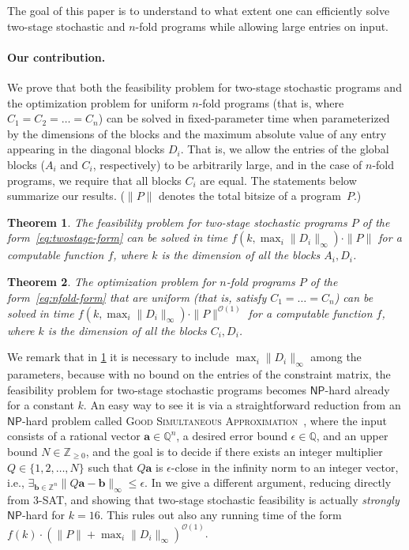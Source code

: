 \documentclass{article}
\newtheorem{theorem}{Theorem}\newtheorem{lemma}[theorem]{Lemma}\newtheorem{proposition}[theorem]{Proposition}\newtheorem{corollary}[theorem]{Corollary}\newtheorem{definition}[theorem]{Definition}\newtheorem{claim}[theorem]{Claim}\newtheorem{remark}[theorem]{Remark}\newtheorem{observation}[theorem]{Observation}\newtheorem{conjecture}[theorem]{Conjecture}\newtheorem{example}[theorem]{Example}
\renewcommand{\leq}{\leqslant}
\renewcommand{\geq}{\geqslant}
\newcommand{\Z}{\mathbb{Z}}
\newcommand{\Zn}{\Z_{\geq 0}}
\newcommand{\Q}{\mathbb{Q}}
\newcommand{\tup}[1]{{\mathbf{#1}}}
\newcommand{\av}{\tup a}
\newcommand{\bb}{\tup b}
\newcommand{\Oh}{{\mathcal{O}}}
\begin{document}
The goal of this paper is to understand to what extent one can efficiently solve two-stage stochastic and $n$-fold programs
while allowing large entries on input.

\paragraph*{Our contribution.} We prove that both the feasibility problem for two-stage stochastic programs and the optimization problem for uniform $n$-fold programs (that is, where $C_1=C_2=\ldots=C_n$) can be solved in fixed-parameter time when parameterized by the dimensions of the blocks and the maximum absolute value of any entry appearing in the diagonal blocks $D_i$. That is, we allow the entries of the global blocks ($A_i$ and $C_i$, respectively) to be arbitrarily large, and in the case of $n$-fold programs, we require that all blocks $C_i$ are equal. The statements below summarize our results. ($\|P\|$ denotes the total bitsize of a program~$P$.)

\begin{theorem}\label{thm:2stage-intro}
   The feasibility problem for two-stage stochastic programs $P$ of the form~\cref{eq:twostage-form} can be solved in time $f(k,\max_i \|D_i\|_\infty)\cdot \|P\|$ for a computable function $f$, where $k$ is the dimension of all the blocks $A_i,D_i$.
\end{theorem}

\begin{theorem}\label{thm:nfold-intro}
    The optimization problem for $n$-fold programs $P$ of the form~\cref{eq:nfold-form} that are uniform (that is, satisfy $C_1=\ldots=C_n$) can be solved in time $f(k,\max_i \|D_i\|_\infty)\cdot \|P\|^{\Oh(1)}$ for a computable function $f$, where $k$ is the dimension of all the blocks $C_i,D_i$.
\end{theorem}

We remark that in \cref{thm:2stage-intro} it is necessary to include $\max_i \|D_i\|_\infty$ among the parameters, because with no bound on the entries of the constraint matrix, the feasibility problem for two-stage stochastic programs becomes $\mathsf{NP}$-hard already for a constant $k$. An easy way to see it is via a straightforward reduction from an $\mathsf{NP}$-hard problem called \textsc{Good Simultaneous Approximation}~\cite{Lagarias85}, where the input consists of a rational vector $\av \in \Q^n$, a desired error bound $\epsilon \in \Q$, and an upper bound $N \in \Zn$, and the goal is to decide if there exists an integer multiplier $Q \in \{1, 2, \ldots, N\}$ such that $Q\av$ is $\epsilon$-close in the infinity norm to an integer vector, i.e., $\exists_{\bb \in \Z^n} \|Q\av - \bb\|_\infty \leq \epsilon$. In  we give a different argument, reducing directly from 3-SAT, and showing that two-stage stochastic feasibility is actually \emph{strongly} $\mathsf{NP}$-hard for $k=16$. This rules out also any running time of the form $f(k) \cdot (\|P\|+\max_i \|D_i\|_\infty)^{\Oh(1)}$.
\end{document}
